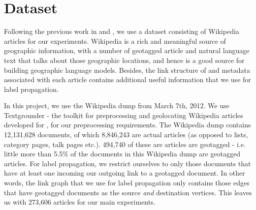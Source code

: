 
\section{Dataset}    

\par Following the previous work in  and
, we use a dataset consisting of Wikipedia articles for
our experiments. Wikipedia is a rich and meaningful source of geographic
information, with a number of geotagged article and natural language text that
talks about those geographic locations, and hence is a good source for
building geographic language models. Besides, the link structure of and
metadata associated with each  article contains additional useful information
that we use for label propagation. 

\par In this project, we use the Wikipedia dump from March 7th, 2012. We use
Textgrounder - the toolkit for preprocessing and geolocating Wikipedia
articles developed for , for our preprocessing
requirements. The Wikipedia dump contains 12,131,628 documents, of which
8,846,243 are actual articles  (as opposed to lists, category pages, talk
pages etc.). 494,740 of these are articles are geotagged - i.e. little more than
5.5\% of the documents in this Wikipedia dump are geotagged articles.  For
label propagation, we restrict ourselves to only those documents that have at
least one incoming our outgoing link to a geotagged document. In other words,
the link graph that we use for label propagation only contains those edges
that have geotagged documents as the source \emph{and} destination vertices. This
leaves us with 273,606 articles for our main experiments.

